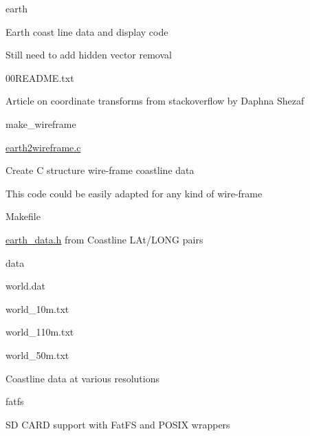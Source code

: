 \begin{DoxyItemize}
\item earth
\begin{DoxyItemize}
\item Earth coast line data and display code
\item Still need to add hidden vector removal
\begin{DoxyItemize}
\item 00\-R\-E\-A\-D\-M\-E.\-txt
\begin{DoxyItemize}
\item Article on coordinate transforms from stackoverflow by Daphna Shezaf
\end{DoxyItemize}
\item make\-\_\-wireframe
\begin{DoxyItemize}
\item \hyperlink{earth2wireframe_8c}{earth2wireframe.\-c}
\begin{DoxyItemize}
\item Create C structure wire-\/frame coastline data
\item This code could be easily adapted for any kind of wire-\/frame
\end{DoxyItemize}
\item Makefile
\begin{DoxyItemize}
\item \hyperlink{earth__data_8h}{earth\-\_\-data.\-h} from Coastline L\-At/\-L\-O\-N\-G pairs
\end{DoxyItemize}
\item data
\begin{DoxyItemize}
\item world.\-dat
\item world\-\_\-10m.\-txt
\item world\-\_\-110m.\-txt
\item world\-\_\-50m.\-txt
\begin{DoxyItemize}
\item Coastline data at various resolutions
\end{DoxyItemize}
\end{DoxyItemize}
\end{DoxyItemize}
\end{DoxyItemize}
\end{DoxyItemize}
\item fatfs
\begin{DoxyItemize}
\item S\-D C\-A\-R\-D support with Fat\-F\-S and P\-O\-S\-I\-X wrappers
\begin{DoxyItemize}

\end{DoxyItemize}
\end{DoxyItemize}
\end{DoxyItemize}
